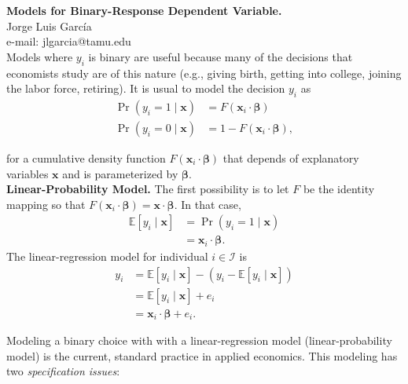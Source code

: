 
\let\counterwithout\relax
\let\counterwithin\relax
{}



\noindent \textbf{Models for Binary-Response Dependent Variable.}\\
\noindent Jorge Luis García \\
\noindent e-mail: jlgarcia@tamu.edu\\

\noindent Models where $y_i$ is binary are useful because many of the decisions that economists study are of this nature (e.g., giving birth, getting into college, joining the labor force, retiring). It is usual to model the decision $y_i$ as
\begin{align}
	\Pr \left( y_i = 1 \mid \bm{x} \right) & = F \left( \bm{x}_i \cdot \bm{\beta} \right) \nonumber \\ 
	\Pr \left( y_i = 0 \mid \bm{x} \right) & = 1 - F \left( \bm{x}_i \cdot \bm{\beta} \right), 
\end{align}

\noindent for a cumulative density function $F \left( \bm{x}_i \cdot \bm{\beta} \right)$ that depends of explanatory variables $\bm{x}$ and is parameterized by $\bm{\beta}$.\\

\noindent \textbf{Linear-Probability Model.} The first possibility is to let $F$ be the identity mapping so that $F \left( \bm{x}_i \cdot \bm{\beta} \right) = \bm{x} \cdot \bm{\beta}$. In that case, 
\begin{align}
	\mathbb{E} \left[ y_i \mid \bm{x} \right] & = \Pr \left( y_i = 1 \mid \bm{x} \right) \nonumber \\  
											  & =  \bm{x}_i \cdot \bm{\beta}. 
\end{align} 
\noindent The linear-regression model for individual $i \in \mathcal{I}$ is
\begin{align}
	y_i & = \mathbb{E} \left[ y_i \mid \bm{x} \right] - \left( y_i - \mathbb{E} \left[ y_i \mid \bm{x} \right] \right) \nonumber \\ 
		& = \mathbb{E} \left[ y_i \mid \bm{x} \right] + e_i \nonumber \\
		& = \bm{x}_i \cdot \bm{\beta} + e_i.
\end{align}

\noindent Modeling a binary choice with with a linear-regression model (linear-probability model) is the current, standard practice in applied economics. This modeling has two \textit{specification issues}:

